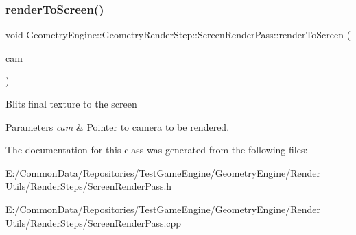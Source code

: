 \subsubsection{\texorpdfstring{renderToScreen()}{renderToScreen()}}
{\footnotesize\ttfamily void Geometry\+Engine\+::\+Geometry\+Render\+Step\+::\+Screen\+Render\+Pass\+::render\+To\+Screen (\begin{DoxyParamCaption}\item[{\mbox{\hyperlink{class_geometry_engine_1_1_geometry_world_item_1_1_geometry_camera_1_1_camera}{Geometry\+World\+Item\+::\+Geometry\+Camera\+::\+Camera}} $\ast$}]{cam }\end{DoxyParamCaption})\hspace{0.3cm}{\ttfamily [protected]}}

Blits final texture to the screen 
\begin{DoxyParams}{Parameters}
{\em cam} & Pointer to camera to be rendered. \\
\hline
\end{DoxyParams}


The documentation for this class was generated from the following files\+:\begin{DoxyCompactItemize}
\item 
E\+:/\+Common\+Data/\+Repositories/\+Test\+Game\+Engine/\+Geometry\+Engine/\+Render Utils/\+Render\+Steps/Screen\+Render\+Pass.\+h\item 
E\+:/\+Common\+Data/\+Repositories/\+Test\+Game\+Engine/\+Geometry\+Engine/\+Render Utils/\+Render\+Steps/Screen\+Render\+Pass.\+cpp\end{DoxyCompactItemize}
